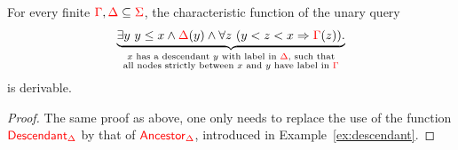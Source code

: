 \begin{lemma}\label{lem:sincemod}
For every finite ${\color{red}{\Gamma}}, {\color{red}{\Delta}} \subseteq {\color{red}{\Sigma}}$,    the characteristic function of the unary query
         \begin{align*}
              \underbrace{\exists y\ y \leq x \land {\color{red}{\Delta}}(y) \land  \forall z \ (y < z < x \Rightarrow {\color{red}{\Gamma}}(z)).}_{\substack{\text{$x$ has a descendant $y$ with label in ${\color{red}{\Delta}}$, such that}\\ \text{all nodes strictly between $x$ and $y$ have label in ${\color{red}{\Gamma}}$}}}  
         \end{align*} 
         is derivable.
\end{lemma}
\begin{proof}
The same proof as above, one only needs to replace the use of the function ${\color{red}{\mathsf{Descendant}_\Delta}}$ by that of ${\color{red}{\mathsf{Ancestor}_\Delta}}$, introduced in Example~\ref{ex:descendant}.
\end{proof}
